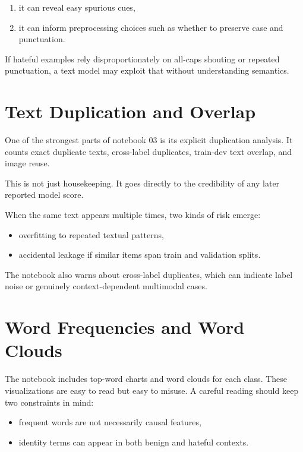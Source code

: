 \documentclass[11pt,a4paper]{report}
\begin{document}
\begin{enumerate}[label=\arabic*.]
\item it can reveal easy spurious cues,
\item it can inform preprocessing choices such as whether to preserve case and punctuation.
\end{enumerate}

If hateful examples rely disproportionately on all-caps shouting or repeated punctuation, a text model may exploit that without understanding semantics.

\section{Text Duplication and Overlap}

One of the strongest parts of notebook 03 is its explicit duplication analysis. It counts exact duplicate texts, cross-label duplicates, train-dev text overlap, and image reuse.

This is not just housekeeping. It goes directly to the credibility of any later reported model score.

When the same text appears multiple times, two kinds of risk emerge:

\begin{itemize}
\item overfitting to repeated textual patterns,
\item accidental leakage if similar items span train and validation splits.
\end{itemize}

The notebook also warns about cross-label duplicates, which can indicate label noise or genuinely context-dependent multimodal cases.

\section{Word Frequencies and Word Clouds}

The notebook includes top-word charts and word clouds for each class. These visualizations are easy to read but easy to misuse. A careful reading should keep two constraints in mind:

\begin{itemize}
\item frequent words are not necessarily causal features,
\item identity terms can appear in both benign and hateful contexts.
\end{itemize}
\end{document}
